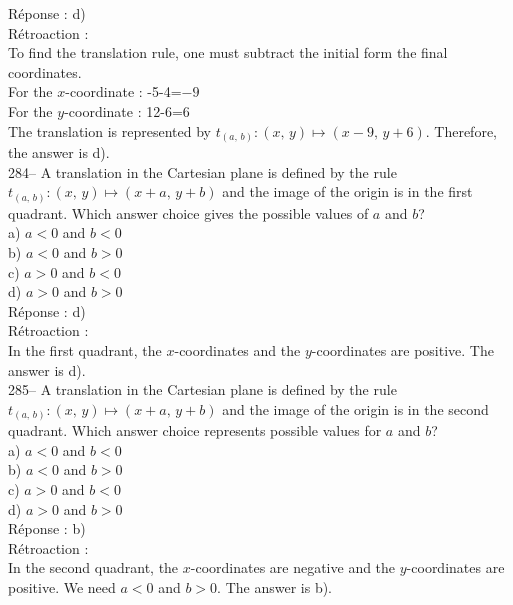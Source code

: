\documentclass[letterpaper, 12pt]{article}
\begin{document}
R\'eponse : d)\\

R\'etroaction :\\
To find the translation rule, one must subtract the initial form the
final coordinates.\\
For the $x$-coordinate :  -5-4=$-9$\\
For the $y$-coordinate :  12-6=6\\
The translation is represented by $t_{\left( a,\,b\right) }
:\left(x,\,y\right)\longmapsto \left(x-9,\,y+6\right)$.
Therefore, the answer is d).\\

284-- A translation in the Cartesian plane is defined by the rule
$t_{\left( a,\,b\right) } :\left(x,\,y\right)\longmapsto
\left(x+a,\,y+b\right) $ and the image of the origin is in the first
quadrant. Which answer choice gives the possible values of $a$
and $b$?\\

a) $a<0$ and $b<0$\\
b) $a<0$ and $b>0$\\
c) $a>0$ and $b<0$\\
d) $a>0$ and $b>0$\\

R\'eponse : d)\\

R\'etroaction : \\
In the first quadrant, the $x$-coordinates and the $y$-coordinates
are positive. The answer is d).\\

285-- A translation in the Cartesian plane is defined by the rule
$t_{\left( a,\,b\right) } :\left(x,\,y\right)\longmapsto
\left(x+a,\,y+b\right) $ and the image of the origin is in the
second quadrant. Which answer choice represents possible values for $a$ and $b$?\\

a) $a<0$ and $b<0$\\
b) $a<0$ and $b>0$\\
c) $a>0$ and $b<0$\\
d) $a>0$ and $b>0$\\

R\'eponse : b)\\

R\'etroaction : \\
In the second quadrant, the $x$-coordinates are negative and the
$y$-coordinates are positive. We need $a<0$ and $b>0$. The answer is
b).\\
\end{document}
